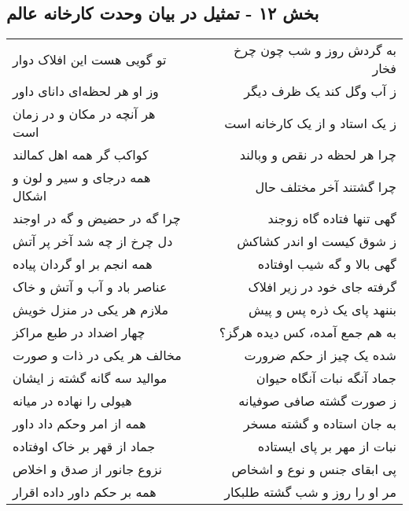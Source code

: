\begin{center}
\section*{بخش ۱۲ - تمثیل در بیان وحدت کارخانه عالم}
\label{sec:sh012}
\begin{longtable}{l p{0.5cm} r}
تو گویی هست این افلاک دوار
&&
به گردش روز و شب چون چرخ فخار
\\
وز او هر لحظه‌ای دانای داور
&&
ز آب وگل کند یک ظرف دیگر
\\
هر آنچه در مکان و در زمان است
&&
ز یک استاد و از یک کارخانه است
\\
کواکب گر همه اهل کمالند
&&
چرا هر لحظه در نقص و وبالند
\\
همه درجای و سیر و لون و اشکال
&&
چرا گشتند آخر مختلف حال
\\
چرا گه در حضیض و گه در اوجند
&&
گهی تنها فتاده گاه زوجند
\\
دل چرخ از چه شد آخر پر آتش
&&
ز شوق کیست او اندر کشاکش
\\
همه انجم بر او گردان پیاده
&&
گهی بالا و گه شیب اوفتاده
\\
عناصر باد و آب و آتش و خاک
&&
گرفته جای خود در زیر افلاک
\\
ملازم هر یکی در منزل خویش
&&
بننهد پای یک ذره پس و پیش
\\
چهار اضداد در طبع مراکز
&&
به هم جمع آمده، کس دیده هرگز؟
\\
مخالف هر یکی در ذات و صورت
&&
شده یک چیز از حکم ضرورت
\\
موالید سه گانه گشته ز ایشان
&&
جماد آنگه نبات آنگاه حیوان
\\
هیولی را نهاده در میانه
&&
ز صورت گشته صافی صوفیانه
\\
همه از امر وحکم داد داور
&&
به جان استاده و گشته مسخر
\\
جماد از قهر بر خاک اوفتاده
&&
نبات از مهر بر پای ایستاده
\\
نزوع جانور از صدق و اخلاص
&&
پی ابقای جنس و نوع و اشخاص
\\
همه بر حکم داور داده اقرار
&&
مر او را روز و شب گشته طلبکار
\\
\end{longtable}
\end{center}
